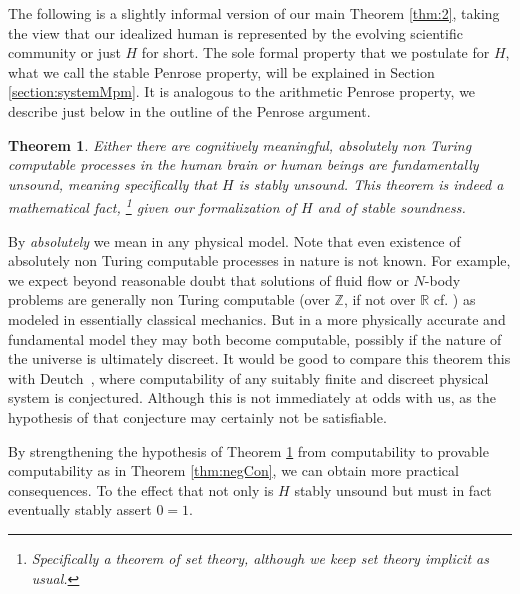 \documentclass{amsart}  %
\numberwithin{equation}{section}
\newtheorem{theorem}[equation]{Theorem}
\theoremstyle{definition}
\theoremstyle{remark}
\begin{document}
{The following is a slightly informal version of our main Theorem \ref{thm:2}, taking the view that our idealized human is represented by the evolving scientific community or just $H$ for short.  The sole formal property that we postulate for $H$, what we call the stable Penrose property, will be explained in Section \ref{section:systemMpm}. It is analogous to the arithmetic Penrose property, we describe just below in the outline of the Penrose argument.
\begin{theorem} \label{thm:1} Either there are cognitively meaningful, absolutely non Turing computable processes in the human brain   or human beings are fundamentally unsound, meaning specifically that $H$ is stably unsound. This theorem is indeed a mathematical fact, \footnote{Specifically a theorem of set theory, although we keep set theory implicit as usual.} given our formalization of $H$ and of stable soundness.
\end{theorem} 
By \emph{absolutely} we mean in any physical model. Note that even existence of absolutely non Turing computable processes in nature is not known. For example, we expect beyond reasonable doubt that solutions of fluid flow or $N$-body problems are generally non Turing computable (over $\mathbb{Z}$, if not over $\mathbb{R}$ cf. \cite{citeBlumShubSmalen}) as modeled in essentially classical mechanics.  But in a more physically accurate and fundamental model they may both become computable, possibly if the nature of the universe is ultimately discreet. It would be good to compare this theorem this with Deutch~\cite{citeDeutsch}, where computability of any suitably finite and discreet physical system is conjectured. Although this is not immediately at odds with us, as the hypothesis of that conjecture may certainly not be satisfiable. 

By strengthening the hypothesis of Theorem \ref{thm:1} from computability  to provable computability as in Theorem \ref{thm:negCon}, we can obtain more practical consequences. To the effect that not only is $H$ stably unsound but must in fact eventually stably assert $0=1$.
}
\end{document}
